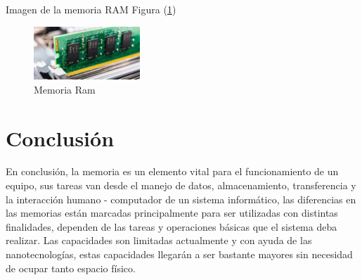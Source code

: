 \documentclass{article}
\begin{document}
Imagen de la memoria RAM Figura (\ref{fig:RAM})

\begin{figure}[h]
\includegraphics[width=4cm]{Random access memory.jpg}
\centering
\caption{Memoria Ram}
\label{fig:RAM}
\end{figure}
\cite{Memory}

\section{Conclusión} \label{conclulsion}
En conclusión, la memoria es un elemento vital para el funcionamiento de un equipo, sus tareas van desde el manejo de datos, almacenamiento, transferencia y la interacción humano - computador de un sistema informático, las diferencias en las memorias están marcadas principalmente para ser utilizadas con distintas finalidades, dependen de las tareas y operaciones básicas que el sistema deba realizar. Las capacidades son limitadas actualmente y con ayuda de las nanotecnologías, estas capacidades llegarán a ser bastante mayores sin necesidad de ocupar tanto espacio físico.


\end{document}
